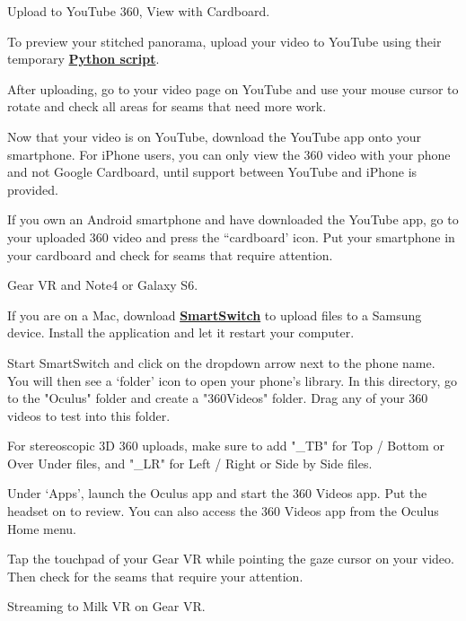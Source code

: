 \begin{fullwidth}
\clearpage
{\large Upload to YouTube 360, View with Cardboard. \par}

To preview your stitched panorama, upload your video to YouTube using their temporary \textbf{\href{https://www.youtube.com/watch?v=Z8VlD2rtACA}{Python script}}.

After uploading, go to your video page on YouTube and use your mouse cursor to rotate and check all areas for seams that need more work.

Now that your video is on YouTube, download the YouTube app onto your smartphone. For iPhone users, you can only view the 360 video with your phone and not Google Cardboard, until support between YouTube and iPhone is provided.

If you own an Android smartphone and have downloaded the YouTube app, go to your uploaded 360 video and press the “cardboard’ icon. Put your smartphone in your cardboard and check for seams that require attention.

{\large Gear VR and Note4 or Galaxy S6. \par}

If you are on a Mac, download \textbf{\href{https://www.dropbox.com/sh/8kqte3wtyt3vltu/AAAjUnNxtXhaxprWF8_q9zbCa?dl=0}{SmartSwitch}} to upload files to a Samsung device. Install the application and let it restart your computer.

Start SmartSwitch and click on the dropdown arrow next to the phone name. You will then see a ‘folder’ icon to open your phone's library. In this directory, go to the "Oculus" folder and create a "360Videos" folder. Drag any of your 360 videos to test into this folder.

\tip For stereoscopic 3D 360 uploads, make sure to add "\_TB" for Top / Bottom or Over Under files, and "\_LR" for Left / Right or Side by Side files.


Under ‘Apps’, launch the Oculus app and start the 360 Videos app. Put the headset on to review. You can also access the 360 Videos app from the Oculus Home menu.


Tap the touchpad of your Gear VR while pointing the gaze cursor on your video. Then check for the seams that require your attention.

{\large Streaming to Milk VR on Gear VR. \par}


\end{fullwidth}
